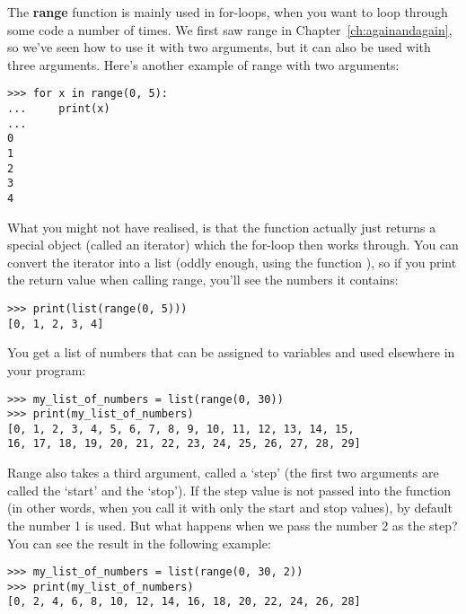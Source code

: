 The \textbf{range} function is mainly used in for-loops, when you want to loop through some code a number of times. We first saw range in Chapter~\ref{ch:againandagain}, so we've seen how to use it with two arguments, but it can also be used with three arguments. Here's another example of range with two arguments:

\begin{listing}
\begin{verbatim}
>>> for x in range(0, 5):
...     print(x)
... 
0
1
2
3
4
\end{verbatim}
\end{listing}

\noindent
What you might not have realised, is that the  function actually just returns a special object (called an iterator) which the for-loop then works through. You can convert the iterator into a list (oddly enough, using the function ), so if you print the return value when calling range, you'll see the numbers it contains:

\begin{listing}
\begin{verbatim}
>>> print(list(range(0, 5)))
[0, 1, 2, 3, 4]
\end{verbatim}
\end{listing}

\noindent
You get a list of numbers that can be assigned to variables and used elsewhere in your program:

\begin{listingignore}
\begin{verbatim}
>>> my_list_of_numbers = list(range(0, 30))
>>> print(my_list_of_numbers)
[0, 1, 2, 3, 4, 5, 6, 7, 8, 9, 10, 11, 12, 13, 14, 15, 
16, 17, 18, 19, 20, 21, 22, 23, 24, 25, 26, 27, 28, 29]
\end{verbatim}
\end{listingignore}

\noindent
Range also takes a third argument, called a `step' (the first two arguments are called the `start' and the `stop'). If the step value is not passed into the function (in other words, when you call it with only the start and stop values), by default the number 1 is used. But what happens when we pass the number 2 as the step?  You can see the result in the following example:

\begin{listing}
\begin{verbatim}
>>> my_list_of_numbers = list(range(0, 30, 2))
>>> print(my_list_of_numbers)
[0, 2, 4, 6, 8, 10, 12, 14, 16, 18, 20, 22, 24, 26, 28]
\end{verbatim}
\end{listing}

